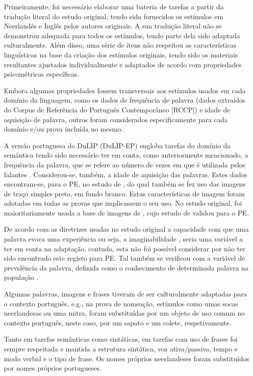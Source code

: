 \documentclass[output=paper,colorlinks,citecolor=brown,booklanguage=portuguese]{langscibook}
\begin{document}
Primeiramente, foi necessário elaborar uma bateria de tarefas a partir da tradução literal do estudo original, tendo sido fornecidos os estímulos em Neerlandês e Inglês pelos autores originais. A sua tradução literal não se demonstrou adequada para todos os estímulos, tendo parte dela sido adaptada culturalmente. Além disso, uma série de itens não respeitou as características linguísticas na base da criação dos estímulos originais, tendo sido os materiais resultantes ajustados individualmente e adaptados de acordo com propriedades psicométricas específicas.

Embora algumas propriedades fossem transversais aos estímulos usados em cada domínio da linguagem, como os dados de frequência de palavra (dados extraídos do Corpus de Referência do Português Contemporâneo [RCCP]) e idade de aquisição de palavra, outros foram considerados especificamente para cada domínio e/ou prova incluída no mesmo. 

A versão portuguesa do DuLIP (DuLIP-EP) engloba tarefas do domínio da semântica tendo sido necessário ter em conta, como anteriormente mencionado, a frequência da palavra, que se refere ao número de vezes em que é utilizada pelos falantes \citep{Leitao2014, Monsell1989}. Considerou-se, também, a idade de aquisição das palavras. Estes dados encontram-se, para o PE, no estudo de \citet{Ventura2003}, do qual também se fez uso das imagens de traço simples preto, em fundo branco. Estas características de imagem foram adotadas em todas as provas que implicassem o seu uso. No estudo original, foi maioritariamente usada a base de imagens de \citet{Snodgrass1980}, cujo estudo de \citet{Ventura2003} validou para o PE. 

De acordo com as diretrizes usadas no estudo original a capacidade com que uma palavra evoca uma experiência ou seja, a imaginabilidade \citep{Leitao2014}, seria uma variável a ter em conta na adaptação, contudo, esta não foi possível considerar por não ter sido encontrado este registo para PE. Tal também se verificou com a variável de prevalência da palavra, definida como o conhecimento de determinada palavra na população \citep{Brysbaert2016}.

Algumas palavras, imagens e frases tiveram de ser culturalmente adaptadas para o contexto português, e.g., na prova de nomeação, estímulos como umas socas neerlandesas ou uma mitra, foram substituídas por um objeto de uso comum no contexto português, neste caso, por um sapato e um colete, respetivamente.

Tanto em tarefas semânticas como sintáticas, em tarefas com uso de frases foi sempre respeitada e mantida a estrutura sintática, voz ativa/passiva, tempo e modo verbal e o tipo de frase. Os nomes próprios neerlandeses foram substituídos por nomes próprios portugueses. 
\end{document}
